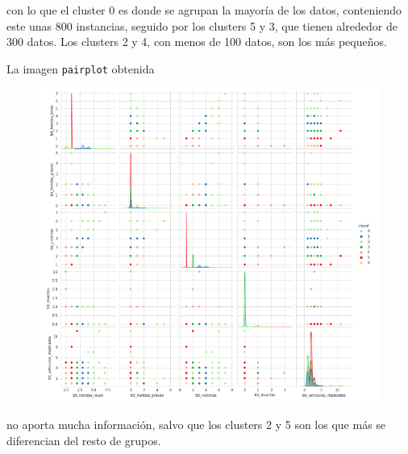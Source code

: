\documentclass[a4paper,11pt]{book}
\begin{document}
con lo que el cluster 0 es donde se agrupan la mayoría de los datos, conteniendo este unas 800 instancias, seguido por los clusters 5 y 3, que tienen alrededor de 300 datos. Los clusters 2 y 4, con menos de 100 datos, son los más pequeños.

La imagen \texttt{pairplot} obtenida
\vspace{2cm}
\begin{figure}
	\centering
	\includegraphics[width=1.1\linewidth]{img/pairplot2}
	\caption{}
	\label{fig:pairplot2}
\end{figure}

no aporta mucha información, salvo que los clusters 2 y 5 son los que más se diferencian del resto de grupos.
\end{document}
